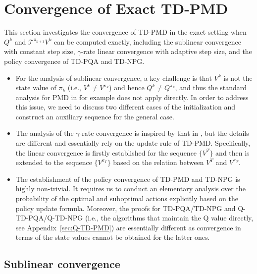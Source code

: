 \documentclass[10pt]{article}
\newcommand{\calT}{\mathcal{T}}
\newcommand{\ls}{\left}
\newcommand{\rs}{\right}
\theoremstyle{plain}
\newtheorem{theorem}{Theorem}[section]
\theoremstyle{definition}
\begin{document}
\section{Convergence of Exact TD-PMD}
\label{sec:exact-TD-PMD}
{This section  investigates the convergence of TD-PMD in the exact setting when   $Q^k$ and $\calT^{\pi_{k+1}} V^k$ can be computed exactly, including the sublinear convergence with constant step size, $\gamma$-rate linear convergence with adaptive step size, and the policy convergence of TD-PQA and TD-NPG.
\begin{itemize}
    \item For the analysis of sublinear convergence, a key challenge  is that   $V^k$ is not the state value of $\pi_k$ (i.e., $V^k\neq V^{\pi_k}$) and hence $Q^k\neq Q^{\pi_k}$, and thus the standard analysis for PMD in for example \cite{Xiao_2022} does not apply directly. In order to address this issue, we need to discuss two different cases of the initialization and construct an auxiliary sequence for the general case.
    \item The analysis of the $\gamma$-rate convergence is inspired by that in \cite{Johnson_Pike-Burke_Rebeschini_2023}, but the details are different and essentially rely on the update rule of TD-PMD. Specifically, the linear convergence is firstly established for the  sequence $\{V^{T}\}$ and then is extended to the  sequence $\{V^{\pi_T}\}$ based on the relation between $V^T$ and $V^{\pi_T}$.
    \item The establishment of the policy convergence of TD-PMD and TD-NPG is highly non-trivial. It requires us to conduct an elementary analysis over the probability of the optimal and suboptimal   actions explicitly based on the policy update formula. Moreover, the proofs for TD-PQA/TD-NPG and Q-TD-PQA/Q-TD-NPG (i.e., the algorithms that maintain the Q value directly, see Appendix~\ref{sec:Q-TD-PMD}) are essentially different as convergence in terms of the state values cannot be obtained for the latter ones.
\end{itemize}
}




\subsection{Sublinear convergence}
\label{sec:sublinaer-convergence}
\end{document}
